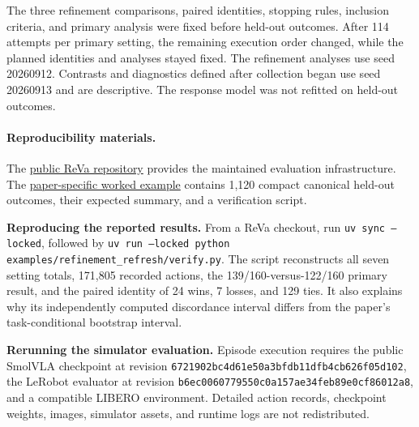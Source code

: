 \documentclass{article}
\begin{document}
{The three refinement comparisons, paired identities, stopping rules, inclusion
criteria, and primary analysis were fixed before held-out outcomes. After
114 attempts per primary setting, the remaining execution order changed, while
the planned identities and analyses stayed fixed. The refinement analyses use
seed 20260912. Contrasts and diagnostics defined after collection began use seed
20260913 and are descriptive. The response model was not refitted on held-out
outcomes.

\paragraph{Reproducibility materials.}
The \href{https://github.com/maatinstitute/ReVa}{public ReVa repository}
provides the maintained evaluation infrastructure. The
\href{https://github.com/maatinstitute/ReVa/tree/main/examples/refinement_refresh}{paper-specific worked example}
contains 1,120 compact canonical held-out outcomes, their expected summary, and
a verification script.

\textbf{Reproducing the reported results.}
From a ReVa checkout, run \texttt{uv sync --locked}, followed by
\texttt{uv run --locked python examples/refinement\_refresh/verify.py}. The
script reconstructs all seven setting totals, 171,805 recorded actions, the
139/160-versus-122/160 primary result, and the paired identity of 24 wins,
7 losses, and 129 ties. It also explains why its independently computed
discordance interval differs from the paper's task-conditional bootstrap
interval.

\textbf{Rerunning the simulator evaluation.}
Episode execution requires the public SmolVLA checkpoint at revision
\texttt{6721902bc4d61e50a3bfdb11dfb4cb626f05d102}, the LeRobot evaluator at
revision \texttt{b6ec0060779550c0a157ae34feb89e0cf86012a8}, and a compatible
LIBERO environment. Detailed action records, checkpoint weights, images,
simulator assets, and runtime logs are not redistributed.
}
\end{document}
